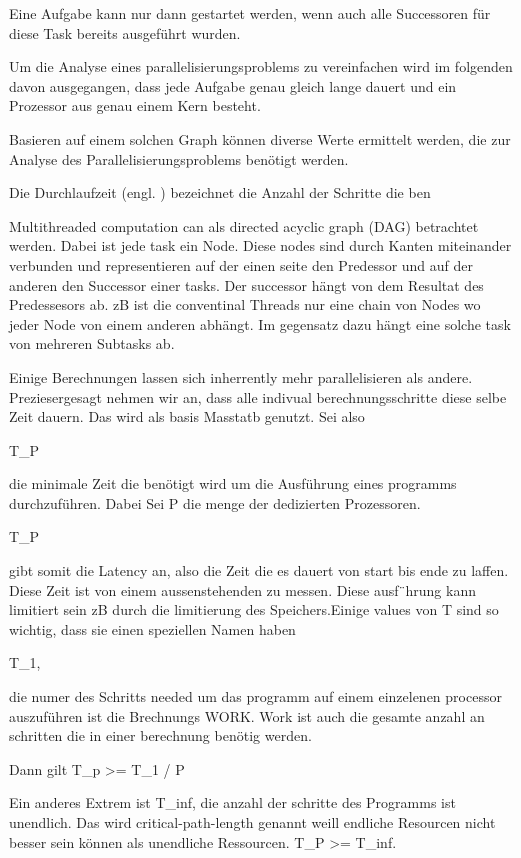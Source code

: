 Eine Aufgabe kann nur dann gestartet werden, wenn auch alle Successoren für diese Task bereits ausgeführt wurden. 

Um die Analyse eines parallelisierungsproblems zu vereinfachen wird im folgenden davon ausgegangen, dass jede Aufgabe genau gleich lange dauert und ein Prozessor aus genau einem Kern besteht.


Basieren auf einem solchen Graph können diverse Werte ermittelt werden, die zur Analyse des Parallelisierungsproblems benötigt werden. 

Die Durchlaufzeit (engl. ) bezeichnet die Anzahl der Schritte die ben





Multithreaded computation can als directed acyclic graph (DAG) betrachtet werden. Dabei ist jede task ein Node. Diese nodes sind durch Kanten miteinander verbunden und representieren auf der einen seite den Predessor und auf der anderen den Successor einer tasks. Der successor hängt von dem Resultat des Predessesors ab. zB ist die conventinal Threads nur eine chain von Nodes wo jeder Node von einem anderen abhängt. Im gegensatz dazu hängt eine solche task von mehreren Subtasks ab.

Einige Berechnungen lassen sich inherrently mehr parallelisieren als andere. Preziesergesagt nehmen wir an, dass alle indivual berechnungsschritte diese selbe Zeit dauern. Das wird als basis Masstatb genutzt. Sei also

T_P 

die minimale Zeit die benötigt wird um die Ausführung eines programms durchzuführen. Dabei Sei P die menge der dedizierten Prozessoren. 

T_P

 gibt somit die Latency an, also die Zeit die es dauert von start bis ende zu laffen. Diese Zeit ist von einem aussenstehenden zu messen. Diese ausf¨hrung kann limitiert sein zB durch die limitierung des Speichers.Einige values von T sind so wichtig, dass sie einen speziellen Namen haben 

 T_1,

 die numer des Schritts needed um das programm auf einem einzelenen processor auszuführen ist die Brechnungs WORK. Work ist auch die gesamte anzahl an schritten die in einer berechnung benötig werden. 

Dann gilt T_p >= T_1 / P

Ein anderes Extrem ist 
T_inf, 
die anzahl der schritte des Programms ist unendlich. Das wird critical-path-length genannt weill endliche Resourcen nicht besser sein können als unendliche Ressourcen. 
T_P >= T_inf.


